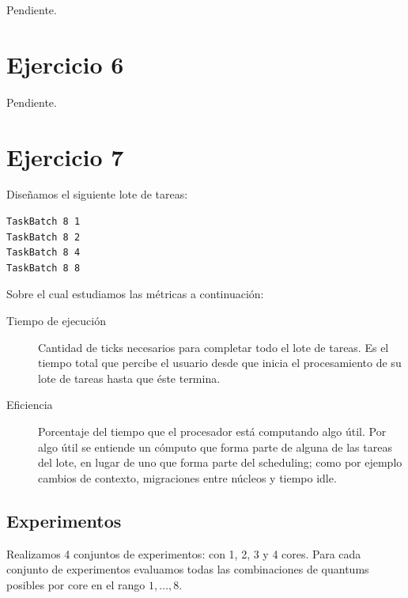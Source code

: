 \documentclass[a4paper,10pt,twoside]{article}
\begin{document}
Pendiente.




\section{Ejercicio 6}

Pendiente.




\section{Ejercicio 7}

Diseñamos el siguiente lote de tareas:

\begin{verbatim}
TaskBatch 8 1
TaskBatch 8 2
TaskBatch 8 4
TaskBatch 8 8
\end{verbatim}

Sobre el cual estudiamos las métricas a continuación:

\begin{description}
	\item[Tiempo de ejecución]
	Cantidad de ticks necesarios para completar todo el lote de tareas. Es el tiempo total que percibe el usuario desde que inicia el procesamiento de su lote de tareas hasta que éste termina.

	\item[Eficiencia]
	Porcentaje del tiempo que el procesador está computando algo útil. Por algo útil se entiende un cómputo que forma parte de alguna de las tareas del lote, en lugar de uno que forma parte del scheduling; como por ejemplo cambios de contexto, migraciones entre núcleos y tiempo idle.
\end{description}


\subsection{Experimentos}

Realizamos 4 conjuntos de experimentos: con 1, 2, 3 y 4 cores. Para cada conjunto de experimentos evaluamos todas las combinaciones de quantums posibles por core en el rango $1, \ldots, 8$.
\end{document}
